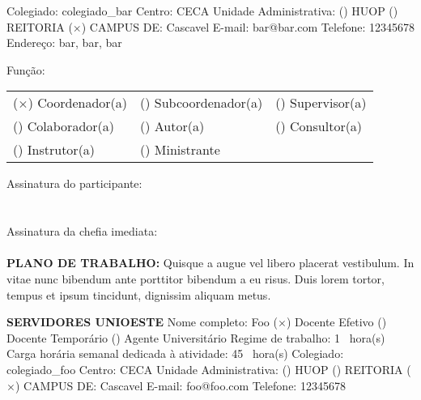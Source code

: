 \documentclass[12pt,a4paper,oneside]{article}%
\begin{document}
\begin{enumerate}
\begin{mdframed}[innertopmargin=5pt, innerleftmargin=3pt, innerrightmargin=3pt]
Colegiado: %
colegiado\_bar%
\hfill%
Centro: %
CECA%
\newline%
Unidade Administrativa: %
() HUOP %
() REITORIA %
($\times$) CAMPUS DE: %
Cascavel%
\newline%
E-mail: %
bar@bar.com%
\newline%
Telefone: %
12345678%
\newline%
Endereço: %
bar, bar, bar%
\newline%
\begin{mdframed}[innertopmargin=5pt, innerleftmargin=3pt, innerrightmargin=3pt]%
Função: %
\newline%
\begin{tabularx}{\linewidth}{XXX}%
($\times$) Coordenador(a)&() Subcoordenador(a)&() Supervisor(a)\\%
() Colaborador(a)&() Autor(a)&() Consultor(a)\\%
() Instrutor(a)&() Ministrante&\\%
\end{tabularx}%
\end{mdframed}%
\bigskip%
\bigskip%
Assinatura do participante: \hrulefill \\ \\ \\%
Assinatura da chefia imediata: \hrulefill \\ \\%
\textbf{PLANO DE TRABALHO: }%
Quisque a augue vel libero placerat vestibulum. In vitae nunc bibendum ante porttitor bibendum a eu risus. Duis lorem tortor, tempus et ipsum tincidunt, dignissim aliquam metus.%
\end{mdframed}%
\begin{mdframed}[innertopmargin=5pt, innerleftmargin=3pt, innerrightmargin=3pt]%
\textbf{SERVIDORES UNIOESTE }%
\newline%
Nome completo: %
Foo%
\newline%
 ($\times$) Docente Efetivo %
 () Docente Temporário %
 () Agente Universitário %
\newline%
Regime de trabalho: %
1%
\ hora(s) \hfill%
Carga horária semanal dedicada à atividade: %
45%
\ hora(s) \hfill%
\newline%
Colegiado: %
colegiado\_foo%
\hfill%
Centro: %
CECA%
\newline%
Unidade Administrativa: %
() HUOP %
() REITORIA %
($\times$) CAMPUS DE: %
Cascavel%
\newline%
E-mail: %
foo@foo.com%
\newline%
Telefone: %
12345678%
\newline%

\end{mdframed}
\end{enumerate}
\end{document}
